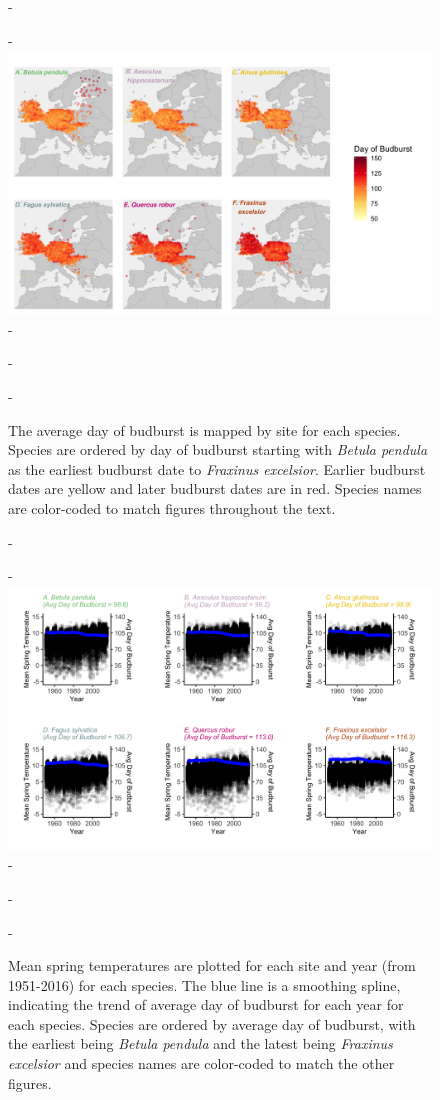 \documentclass{article}\usepackage[]{graphicx}\usepackage[]{color}
\begin{document}
{\begin{figure} [H]
  -\begin{center}
  -\includegraphics[width=14cm]{..//analyses/figures/BB_base.png}
  -\caption{The average day of budburst is mapped by site for each species. Species are ordered by day of budburst starting with \textit{Betula pendula} as the earliest budburst date to \textit{Fraxinus excelsior}. Earlier budburst dates are yellow and later budburst dates are in red. Species names are color-coded to match figures throughout the text. }\label{fig:bbmap}
  -\end{center}
  -\end{figure}}
  
{\begin{figure} [H]
  -\begin{center}
  -\includegraphics[width=16cm]{..//analyses/figures/MSTBB_bySpp.png}
  -\caption{Mean spring temperatures are plotted for each site and year (from 1951-2016) for each species. The blue line is a smoothing spline, indicating the trend of average day of budburst for each year for each species. Species are ordered by average day of budburst, with the earliest being \textit{Betula pendula} and the latest being \textit{Fraxinus excelsior} and species names are color-coded to match the other figures. }\label{fig:mst}
  -\end{center}
  -\end{figure}}
  
\end{document}
